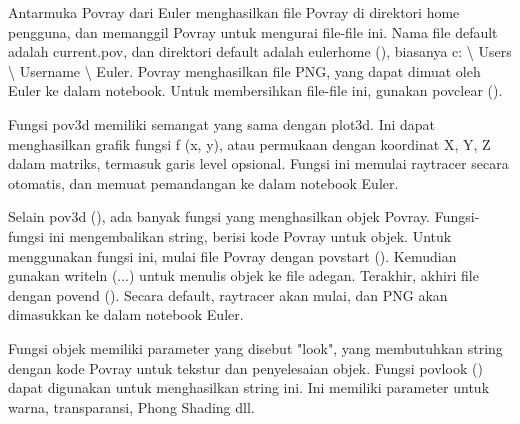 \documentclass{article}
\begin{document}
\begin{eulernotebook}
\begin{eulercomment}
\begin{eulercomment}
\begin{eulercomment}
\begin{eulercomment}
\begin{eulercomment}
\begin{eulercomment}
\begin{eulercomment}
\begin{eulercomment}
\begin{eulercomment}
\begin{eulercomment}
\begin{eulercomment}
\begin{eulercomment}
\begin{eulercomment}
\begin{eulercomment}
\begin{eulercomment}
\begin{eulercomment}
\begin{eulercomment}
\begin{eulercomment}
\begin{eulercomment}
\begin{eulercomment}
\begin{eulercomment}
Antarmuka Povray dari Euler menghasilkan file Povray di direktori home
pengguna, dan memanggil Povray untuk mengurai file-file ini. Nama file
default adalah current.pov, dan direktori default adalah eulerhome (),
biasanya c: \textbackslash{} Users \textbackslash{} Username \textbackslash{} Euler. Povray menghasilkan file PNG,
yang dapat dimuat oleh Euler ke dalam notebook. Untuk membersihkan
file-file ini, gunakan povclear ().

Fungsi pov3d memiliki semangat yang sama dengan plot3d. Ini dapat
menghasilkan grafik fungsi f (x, y), atau permukaan dengan koordinat
X, Y, Z dalam matriks, termasuk garis level opsional. Fungsi ini
memulai raytracer secara otomatis, dan memuat pemandangan ke dalam
notebook Euler.

Selain pov3d (), ada banyak fungsi yang menghasilkan objek Povray.
Fungsi-fungsi ini mengembalikan string, berisi kode Povray untuk
objek. Untuk menggunakan fungsi ini, mulai file Povray dengan povstart
(). Kemudian gunakan writeln (...) untuk menulis objek ke file adegan.
Terakhir, akhiri file dengan povend (). Secara default, raytracer akan
mulai, dan PNG akan dimasukkan ke dalam notebook Euler.

Fungsi objek memiliki parameter yang disebut "look", yang membutuhkan
string dengan kode Povray untuk tekstur dan penyelesaian objek. Fungsi
povlook () dapat digunakan untuk menghasilkan string ini. Ini memiliki
parameter untuk warna, transparansi, Phong Shading dll.


\end{eulercomment}
\end{eulercomment}
\end{eulercomment}
\end{eulercomment}
\end{eulercomment}
\end{eulercomment}
\end{eulercomment}
\end{eulercomment}
\end{eulercomment}
\end{eulercomment}
\end{eulercomment}
\end{eulercomment}
\end{eulercomment}
\end{eulercomment}
\end{eulercomment}
\end{eulercomment}
\end{eulercomment}
\end{eulercomment}
\end{eulercomment}
\end{eulercomment}
\end{eulercomment}
\end{eulernotebook}
\end{document}

